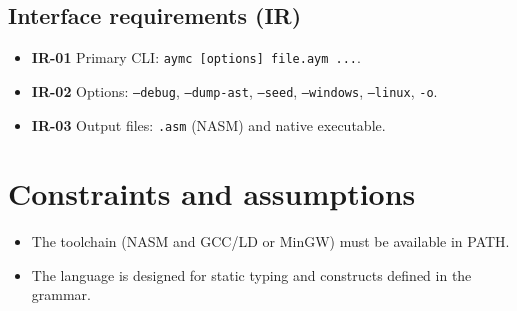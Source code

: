 \documentclass[11pt,a4paper]{article}
\begin{document}
\subsection{Interface requirements (IR)}
\begin{itemize}
    \item \textbf{IR-01} Primary CLI: \texttt{aymc [options] file.aym ...}.
    \item \textbf{IR-02} Options: \texttt{--debug}, \texttt{--dump-ast}, \texttt{--seed}, \texttt{--windows}, \texttt{--linux}, \texttt{-o}.
    \item \textbf{IR-03} Output files: \texttt{.asm} (NASM) and native executable.
\end{itemize}

\section{Constraints and assumptions}
\begin{itemize}
    \item The toolchain (NASM and GCC/LD or MinGW) must be available in PATH.
    \item The language is designed for static typing and constructs defined in the grammar.
\end{itemize}
\end{document}
